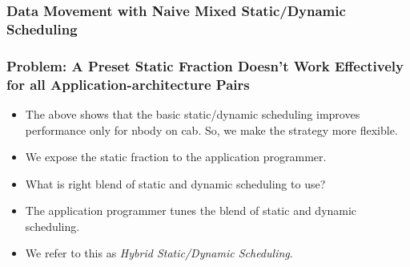 \begin{frame}[label=dmTimes]
\frametitle{Data Movement with Naive Mixed Static/Dynamic Scheduling}
\end{frame}

\begin{frame}[label=noPreset]
\frametitle{Problem: A Preset Static Fraction Doesn't Work Effectively for all Application-architecture Pairs}
\begin{itemize}
\item The above shows that the basic static/dynamic scheduling 
improves performance only for nbody on cab. So, we make the strategy more flexible. 
\end{itemize}
\begin{itemize}
\item We expose the static fraction to the application programmer.  
\item What is right blend of static and dynamic scheduling to use? 
\item The application programmer tunes the blend of static and dynamic scheduling.
\item We refer to this as \textit{Hybrid Static/Dynamic Scheduling}. 
\end{itemize}
\end{frame}

